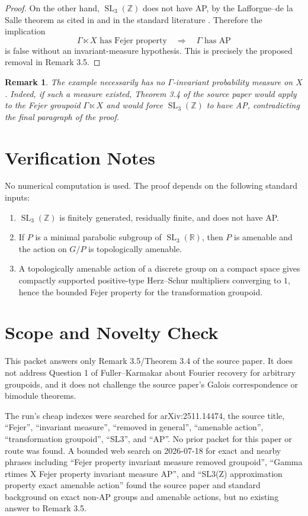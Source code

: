 \documentclass[11pt]{article}
\newtheorem{remark}{Remark}
\newcommand{\R}{\mathbb R}
\newcommand{\Z}{\mathbb Z}
\newcommand{\GammaSL}{\operatorname{SL}_3(\Z)}
\begin{document}
\begin{proof}
On the other hand, \(\operatorname{SL}_3(\Z)\) does not have AP, by the
Lafforgue--de la Salle theorem as cited in \cite{AAK2025} and in the standard
literature \cite{HdL2013}.  Therefore the implication
\[
   \Gamma\ltimes X \text{ has Fejer property}
   \quad\Longrightarrow\quad
   \Gamma \text{ has AP}
\]
is false without an invariant-measure hypothesis.  This is precisely the
proposed removal in Remark 3.5.
\end{proof}

\begin{remark}
The example necessarily has no \(\Gamma\)-invariant probability measure on
\(X\).  Indeed, if such a measure existed, Theorem 3.4 of the source paper
would apply to the Fejer groupoid \(\Gamma\ltimes X\) and would force
\(\GammaSL\) to have AP, contradicting the final paragraph of the proof.
\end{remark}

\section*{Verification Notes}

No numerical computation is used.  The proof depends on the following standard
inputs:
\begin{enumerate}
\item \(\operatorname{SL}_3(\Z)\) is finitely generated, residually finite, and
does not have AP.
\item If \(P\) is a minimal parabolic subgroup of \(\operatorname{SL}_3(\R)\),
then \(P\) is amenable and the action on \(G/P\) is topologically amenable.
\item A topologically amenable action of a discrete group on a compact space
gives compactly supported positive-type Herz--Schur multipliers converging to
\(1\), hence the bounded Fejer property for the transformation groupoid.
\end{enumerate}

\section*{Scope and Novelty Check}

This packet answers only Remark 3.5/Theorem 3.4 of the source paper.  It does
not address Question 1 of Fuller--Karmakar about Fourier recovery for arbitrary
groupoids, and it does not challenge the source paper's Galois correspondence
or bimodule theorems.

The run's cheap indexes were searched for arXiv:2511.14474, the source title,
``Fejer'', ``invariant measure'', ``removed in general'', ``amenable action'',
``transformation groupoid'', ``SL3'', and ``AP''.  No prior packet for this
paper or route was found.  A bounded web search on 2026-07-18 for exact and
nearby phrases including ``Fejer property invariant measure removed groupoid'',
``Gamma rtimes X Fejer property invariant measure AP'', and
``SL3(Z) approximation property exact amenable action'' found the source paper
and standard background on exact non-AP groups and amenable actions, but no
existing answer to Remark 3.5.
\end{document}

